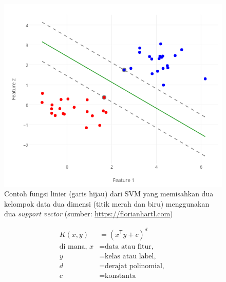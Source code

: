 \begin{figure}
\centering
\includegraphics[scale=0.5]{../images/svm.png}
\caption{Contoh fungsi linier (garis hijau) dari SVM yang memisahkan dua kelompok data dua dimensi (titik merah dan biru) menggunakan dua \textit{support vector} (sumber: \url{https://florianhartl.com})}
\label{fig:svm}
\end{figure}

\noindent \begin{align} \label{eq:poly_kernel}
K(x,y) &= (x^\mathsf{T} y + c)^{d} \\ \nonumber
\textrm{di mana, } x &= \textrm{data atau fitur, } \\ \nonumber 
	y &= \textrm{kelas atau label, } \\ \nonumber
	d &= \textrm{derajat polinomial, } \\ \nonumber 
	c &= \textrm{konstanta} \\ \nonumber 
\end{align}



